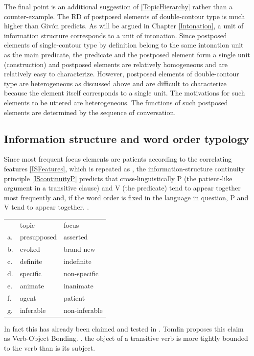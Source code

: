 The final point is an additional suggestion of \ref{TopicHierarchy} rather than a counter-example.
The RD of postposed elements of double-contour type is much higher than Giv\'on predicts.
As will be argued in Chapter \ref{Intonation},
a unit of information structure corresponds to a unit of intonation.
Since postposed elements of single-contour type by definition belong to the same intonation unit as the main predicate,
the predicate and the postposed element form a single unit (construction) and postposed elements are relatively homogeneous and are relatively easy to characterize.
However,
postposed elements of double-contour type are heterogeneous as discussed above and are difficult to characterize
because the element itself corresponds to a single unit.
The motivations for such elements to be uttered are heterogeneous.
The functions of such postposed elements are determined by the sequence of conversation.


\subsection{Information structure and word order typology}\label{WO:Dis:WOTypology}

Since most frequent focus elements are patients according to the correlating features \ref{ISFeatures},
which is repeated as \Next,
the information-structure continuity principle \ref{IScontinuityP} predicts that cross-linguistically
P (the patient-like argument in a transitive clause) and V (the predicate) tend to appear together most frequently and,
if the word order is fixed in the language in question,
P and V tend to appear together.
%
\ex.
\begin{tabular}{lll}
	 & topic & focus \\
	a. & presupposed & asserted \\
	b. & evoked & brand-new \\
	c. & definite & indefinite \\
	d. & specific & non-specific \\
	e. & animate & inanimate \\
	f. & agent & patient \\
	g. & inferable & non-inferable \\
\end{tabular}
%

In fact this has already been claimed and tested in .
Tomlin proposes this claim as Verb-Object Bonding.
%
\ex. 
	the object of a transitive verb is more tightly bounded to the verb
	than is its subject.
	\hfill{\cite[][p.~74]{tomlin86}}

